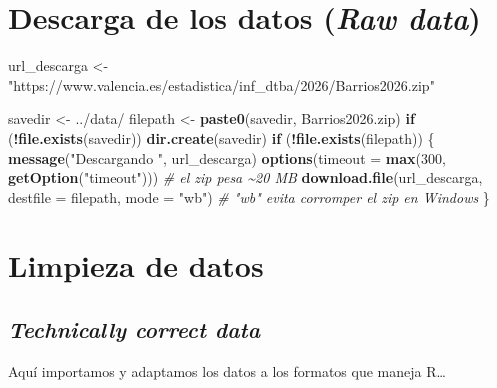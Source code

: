 \documentclass[notspecified,article,submit,moreauthors,pdftex]{Definitions/mdpi}
\newenvironment{Shaded}{\begin{snugshade}}{\end{snugshade}}
\newcommand{\AttributeTok}[1]{\textcolor[rgb]{0.13,0.29,0.53}{#1}}
\newcommand{\CommentTok}[1]{\textcolor[rgb]{0.56,0.35,0.01}{\textit{#1}}}
\newcommand{\ControlFlowTok}[1]{\textcolor[rgb]{0.13,0.29,0.53}{\textbf{#1}}}
\newcommand{\DecValTok}[1]{\textcolor[rgb]{0.00,0.00,0.81}{#1}}
\newcommand{\FunctionTok}[1]{\textcolor[rgb]{0.13,0.29,0.53}{\textbf{#1}}}
\newcommand{\NormalTok}[1]{#1}
\newcommand{\OtherTok}[1]{\textcolor[rgb]{0.56,0.35,0.01}{#1}}
\newcommand{\SpecialCharTok}[1]{\textcolor[rgb]{0.81,0.36,0.00}{\textbf{#1}}}
\newcommand{\StringTok}[1]{\textcolor[rgb]{0.31,0.60,0.02}{#1}}
\begin{document}

\section{\texorpdfstring{Descarga de los datos (\emph{Raw
data})}{Descarga de los datos (Raw data)}}\label{descarga-de-los-datos-raw-data}

\begin{Shaded}
\begin{Highlighting}[]
\NormalTok{url\_descarga }\OtherTok{\textless{}{-}} \StringTok{"https://www.valencia.es/estadistica/inf\_dtba/2026/Barrios2026.zip"}

\NormalTok{savedir }\OtherTok{\textless{}{-}} \StringTok{\textquotesingle{}../data/\textquotesingle{}}
\NormalTok{filepath }\OtherTok{\textless{}{-}} \FunctionTok{paste0}\NormalTok{(savedir, }\StringTok{\textquotesingle{}Barrios2026.zip\textquotesingle{}}\NormalTok{)}
\ControlFlowTok{if}\NormalTok{ (}\SpecialCharTok{!}\FunctionTok{file.exists}\NormalTok{(savedir)) }\FunctionTok{dir.create}\NormalTok{(savedir)}
\ControlFlowTok{if}\NormalTok{ (}\SpecialCharTok{!}\FunctionTok{file.exists}\NormalTok{(filepath)) \{}
  \FunctionTok{message}\NormalTok{(}\StringTok{"Descargando "}\NormalTok{, url\_descarga)}
  \FunctionTok{options}\NormalTok{(}\AttributeTok{timeout =} \FunctionTok{max}\NormalTok{(}\DecValTok{300}\NormalTok{, }\FunctionTok{getOption}\NormalTok{(}\StringTok{"timeout"}\NormalTok{)))  }\CommentTok{\# el zip pesa \textasciitilde{}20 MB}
  \FunctionTok{download.file}\NormalTok{(url\_descarga, }\AttributeTok{destfile =}\NormalTok{ filepath, }\AttributeTok{mode =} \StringTok{"wb"}\NormalTok{)  }\CommentTok{\# "wb" evita corromper el zip en Windows}
\NormalTok{\}}
\end{Highlighting}
\end{Shaded}

\section{Limpieza de datos}\label{limpieza-de-datos}

\subsection{\texorpdfstring{\emph{Technically correct
data}}{Technically correct data}}\label{technically-correct-data}

Aquí importamos y adaptamos los datos a los formatos que maneja
R\ldots{}
\end{document}
